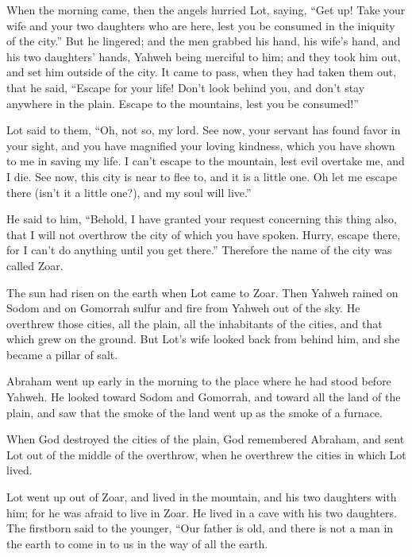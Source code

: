 {When the morning came, then the angels hurried Lot, saying, “Get up! Take your wife and your two daughters who are here, lest you be consumed in the iniquity of the city.”
But he lingered; and the men grabbed his hand, his wife’s hand, and his two daughters’ hands, Yahweh being merciful to him; and they took him out, and set him outside of the city.
It came to pass, when they had taken them out, that he said, “Escape for your life! Don’t look behind you, and don’t stay anywhere in the plain. Escape to the mountains, lest you be consumed!”
\par }{\PP {}Lot said to them, “Oh, not so, my lord.
See now, your servant has found favor in your sight, and you have magnified your loving kindness, which you have shown to me in saving my life. I can’t escape to the mountain, lest evil overtake me, and I die.
See now, this city is near to flee to, and it is a little one. Oh let me escape there (isn’t it a little one?), and my soul will live.”
\par }{\PP {}He said to him, “Behold, I have granted your request concerning this thing also, that I will not overthrow the city of which you have spoken.
Hurry, escape there, for I can’t do anything until you get there.” Therefore the name of the city was called Zoar.
\par }{\PP {}The sun had risen on the earth when Lot came to Zoar.
Then Yahweh rained on Sodom and on Gomorrah sulfur and fire from Yahweh out of the sky.
He overthrew those cities, all the plain, all the inhabitants of the cities, and that which grew on the ground.
But Lot’s wife looked back from behind him, and she became a pillar of salt.
\par }{\PP {}Abraham went up early in the morning to the place where he had stood before Yahweh.
He looked toward Sodom and Gomorrah, and toward all the land of the plain, and saw that the smoke of the land went up as the smoke of a furnace.
\par }{\PP {}When God destroyed the cities of the plain, God remembered Abraham, and sent Lot out of the middle of the overthrow, when he overthrew the cities in which Lot lived.
\par }{\PP {}Lot went up out of Zoar, and lived in the mountain, and his two daughters with him; for he was afraid to live in Zoar. He lived in a cave with his two daughters.
The firstborn said to the younger, “Our father is old, and there is not a man in the earth to come in to us in the way of all the earth.
}
